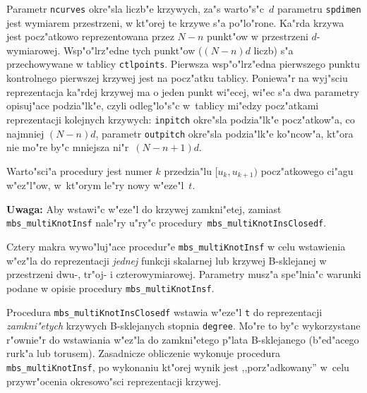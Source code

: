 \begin{sloppypar}
Parametr \texttt{ncurves} okre"sla liczb"e krzywych, za"s warto"s"c~$d$
parametru \texttt{spdimen} jest wymiarem przestrzeni, w kt"orej te krzywe
s"a po"lo"rone. Ka"rda krzywa jest pocz"atkowo reprezentowana przez
$N-n$ punkt"ow w przestrzeni $d$-wymiarowej.
Wsp"o"lrz"edne tych punkt"ow ($(N-n)d$ liczb)
s"a przechowywane w tablicy \texttt{ctlpoints}. Pierwsza wsp"o"lrz"edna
pierwszego punktu kontrolnego pierwszej krzywej jest na pocz"atku tablicy.
Poniewa"r na wyj"sciu reprezentacja ka"rdej krzywej ma o jeden punkt
wi"ecej, wi"ec s"a dwa parametry opisuj"ace podzia"lk"e, czyli
odleg"lo"s"c w~tablicy mi"edzy pocz"atkami reprezentacji kolejnych krzywych:
\texttt{inpitch}
okre"sla podzia"lk"e pocz"atkow"a, co najmniej $(N-n)d$,
parametr \texttt{outpitch} okre"sla podzia"lk"e ko"ncow"a, kt"ora nie mo"re
by"c mniejsza ni"r~$(N-n+1)d$.
\end{sloppypar}

Warto"sci"a procedury jest numer $k$ przedzia"lu $[u_k,u_{k+1})$
pocz"atkowego ci"agu w"ez"l"ow, w~kt"orym le"ry nowy w"eze"l~$t$.

\vspace{\medskipamount}
\noindent
\textbf{Uwaga:} Aby wstawi"c w"eze"l do krzywej zamkni"etej, zamiast
\texttt{mbs\_multiKnotInsf} nale"ry u"ry"c
procedury~\texttt{mbs\_multiKnotInsClosedf}.


\vspace{\bigskipamount}
Cztery makra wywo"luj"ace procedur"e \texttt{mbs\_multiKnotInsf} w celu
wstawienia w"ez"la do reprezentacji \emph{jednej} funkcji skalarnej lub
krzywej B-sklejanej w przestrzeni dwu-, tr"oj- i czterowymiarowej.
Parametry musz"a spe"lnia"c warunki podane w opisie procedury
\texttt{mbs\_multiKnotInsf}.

\vspace{\bigskipamount}
Procedura \texttt{mbs\_multiKnotInsClosedf} wstawia w"eze"l \texttt{t} do
reprezentacji \emph{zamkni"etych} krzywych B-skle\-ja\-nych stopnia
\texttt{degree}. Mo"re to by"c wykorzystane r"ownie"r do wstawiania
w"ez"la do zamkni"etego p"lata B-sklejanego (b"ed"acego rurk"a lub torusem).
Zasadnicze obliczenie wykonuje procedura
\texttt{mbs\_multiKnotInsf}, po wykonaniu kt"orej wynik jest
,,porz"adkowany'' w~celu przywr"ocenia okresowo"sci reprezentacji krzywej.

